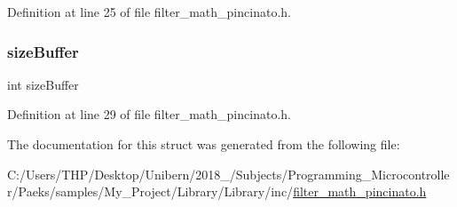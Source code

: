 Definition at line 25 of file filter\+\_\+math\+\_\+pincinato.\+h.

\mbox{\label{struct_biquads_filter___a145948232f729807d798ee4339711815}} 
\subsubsection{\texorpdfstring{size\+Buffer}{sizeBuffer}}
{\footnotesize\ttfamily int size\+Buffer}



Definition at line 29 of file filter\+\_\+math\+\_\+pincinato.\+h.



The documentation for this struct was generated from the following file\+:\begin{DoxyCompactItemize}
\item 
C\+:/\+Users/\+T\+H\+P/\+Desktop/\+Unibern/2018\+\_/\+Subjects/\+Programming\+\_\+\+Microcontroller/\+Paeks/samples/\+My\+\_\+\+Project/\+Library/\+Library/inc/\mbox{\hyperlink{filter__math__pincinato_8h}{filter\+\_\+math\+\_\+pincinato.\+h}}\end{DoxyCompactItemize}
